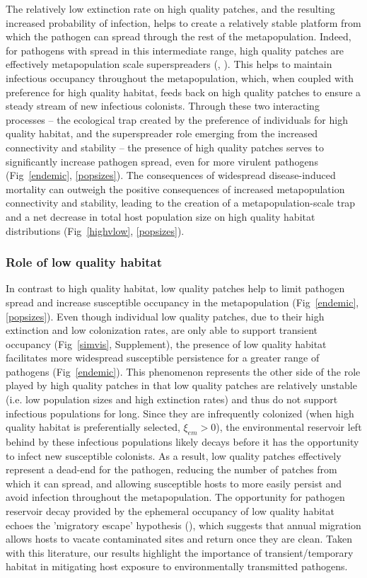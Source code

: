 \documentclass{article}
\begin{document}
The relatively low extinction rate on high quality patches, and the resulting increased probability of infection, helps to create a relatively stable platform from which the pathogen can spread through the rest of the metapopulation.
Indeed, for pathogens with spread in this intermediate range, high quality patches are effectively metapopulation scale superspreaders (\cite{Lloyd-Smith2005}, \cite{Paull2012}).  
This helps to maintain infectious occupancy throughout the metapopulation, which, when coupled with preference for high quality habitat, feeds back on high quality patches to ensure a steady stream of new infectious colonists. 
Through these two interacting processes -- the ecological trap created by the preference of individuals for high quality habitat, and the superspreader role emerging from the increased connectivity and stability -- the presence of high quality patches serves to significantly increase pathogen spread, even for more virulent pathogens (Fig~\ref{endemic}, \ref{popsizes}).
The consequences of widespread disease-induced mortality can outweigh the positive consequences of increased metapopulation connectivity and stability, leading to the creation of a metapopulation-scale trap and a net decrease in total host population size on high quality habitat distributions (Fig~\ref{highvlow}, \ref{popsizes}).  

\subsubsection*{Role of low quality habitat}
In contrast to high quality habitat, low quality patches help to limit pathogen spread and increase susceptible occupancy in the metapopulation (Fig~\ref{endemic}, \ref{popsizes}). 
Even though individual low quality patches, due to their high extinction and low colonization rates, are only able to support transient occupancy (Fig~\ref{simvis}, Supplement), the presence of low quality habitat facilitates more widespread susceptible persistence for a greater range of pathogens (Fig~\ref{endemic}).  
This phenomenon represents the other side of the role played by high quality patches in that low quality patches are relatively unstable (i.e. low population sizes and high extinction rates) and thus do not support infectious populations for long.
Since they are infrequently colonized (when high quality habitat is preferentially selected, $\xi_{em} > 0$), the environmental reservoir left behind by these infectious populations likely decays before it has the opportunity to infect new susceptible colonists. 
As a result, low quality patches effectively represent a dead-end for the pathogen, reducing the number of patches from which it can spread, and allowing susceptible hosts to more easily persist and avoid infection throughout the metapopulation.
The opportunity for pathogen reservoir decay provided by the ephemeral occupancy of low quality habitat echoes the 'migratory escape' hypothesis (\cite{Loehle1995}), which suggests that annual migration allows hosts to vacate contaminated sites and return once they are clean.
Taken with this literature, our results highlight the importance of transient/temporary habitat in mitigating host exposure to environmentally transmitted pathogens.
\end{document}

